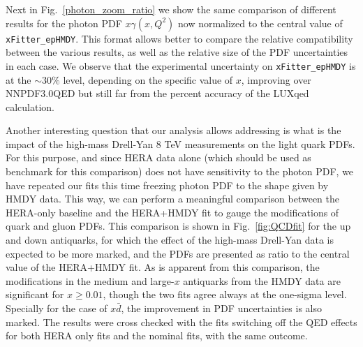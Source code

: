 Next in Fig.~\ref{photon_zoom_ratio} we show the same comparison of different
results for the photon PDF $x\gamma(x,Q^2)$ now normalized to the central value of {\tt xFitter\_epHMDY}.
%
This format allows better to compare the relative compatibility between the various results,
as well as the relative size of the PDF uncertainties in each case.
%
We observe that the experimental uncertainty on {\tt xFitter\_epHMDY} is at the $\sim 30\%$ level,
depending on the specific value of $x$, improving over NNPDF3.0QED but still far from the
percent accuracy of the LUXqed calculation.


Another interesting question that our analysis allows addressing is what is
the impact of the high-mass Drell-Yan 8 TeV measurements on the light quark
PDFs.
%
For this purpose, and since HERA data alone (which should be used as benchmark for
this comparison) does not have sensitivity to the photon PDF,
we have repeated our fits this time freezing photon PDF to the shape given by HMDY data.
%
This way, we can perform a meaningful comparison between the HERA-only baseline and the
HERA+HMDY fit to gauge the modifications of quark and gluon PDFs.
%
This comparison is shown in Fig.~\ref{fig:QCDfit} for the up and down antiquarks,
for which the effect of the high-mass
Drell-Yan data is expected to be more marked, and the PDFs are presented
as ratio to the central value of the HERA+HMDY fit.
%
As is apparent from this comparison, the modifications in the medium and large-$x$
antiquarks from the HMDY data are significant for $x\ge 0.01$, though the two fits
agree always at the one-sigma level.
%
Specially for the case of $x\bar{d}$, the improvement in PDF uncertainties
is also marked.
%
The results were cross checked with the fits switching off the QED effects for both 
HERA only fits and the nominal fits, with the same outcome.


